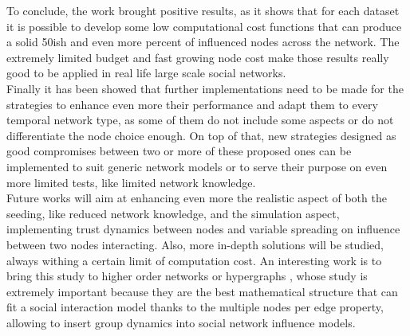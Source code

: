 To conclude, the work brought positive results, as it shows that for each dataset it is possible to develop some low computational cost functions that can produce a solid 50ish and even more percent of influenced nodes across the network. The extremely limited budget and fast growing node cost make those results really good to be applied in real life large scale social networks.\\
Finally it has been showed that further implementations need to be made for the strategies to enhance even more their performance and adapt them to every temporal network type, as some of them do not include some aspects or do not differentiate the node choice enough. On top of that, new strategies designed as good compromises between two or more of these proposed ones can be implemented to suit generic network models or to serve their purpose on even more limited tests, like limited network knowledge.
\\
Future works will aim at enhancing even more the realistic aspect of both the seeding, like reduced network knowledge, and the simulation aspect, implementing trust dynamics between nodes and variable spreading on influence between two nodes interacting. Also, more in-depth solutions will be studied, always withing a certain limit of computation cost. An interesting work is to bring this study to higher order networks or hypergraphs
\cite{https://doi.org/10.48550/arxiv.2206.01394}, whose study is extremely important because they are the best mathematical structure that can fit a social interaction model thanks to the multiple nodes per edge property, allowing to insert group dynamics into social network influence models.